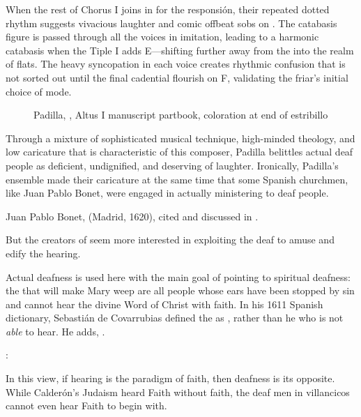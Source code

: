 When the rest of Chorus I joins in for the responsión, their repeated dotted 
rhythm suggests vivacious laughter and comic offbeat sobs on .
The catabasis figure is passed through all the voices in imitation, leading to 
a harmonic catabasis when the Tiple I adds E\fl{}---shifting further away from 
the  into the  realm of flats.
The heavy syncopation in each voice creates rhythmic confusion that is not 
sorted out until the final cadential flourish on F, validating the friar's 
initial choice of mode.

\begin{figure}
    \caption{Padilla, , Altus I manuscript 
    partbook, coloration at end of estribillo}
    \label{figure:Padilla-Sordo1651-AI-coloration}
\end{figure}

Through a mixture of sophisticated musical technique, high-minded theology, and 
low caricature that is characteristic of this composer, Padilla belittles 
actual deaf people as deficient, undignified, and deserving of laughter.
Ironically, Padilla's ensemble made their caricature at the same time that some 
Spanish churchmen, like Juan Pablo Bonet, were engaged in actually ministering 
to deaf people.%
\begin{Footnote}
    Juan Pablo Bonet,  (Madrid, 1620), cited and discussed in 
    \autocite{Plann:DeafEducationSpain}.
\end{Footnote}
But the creators of  seem more interested in 
exploiting the deaf to amuse and edify the hearing.

Actual deafness is used here with the main goal of pointing to spiritual 
deafness: the  that will make Mary weep are all people whose 
ears have been stopped by sin and cannot hear the divine Word of Christ with 
faith.
In his 1611 Spanish dictionary, Sebastián de Covarrubias defined the 
 as , rather than he who is not 
\emph{able} to hear.
He adds, .%
\begin{Footnote}
    \Autocite[]{Covarrubias:Tesoro}:
\end{Footnote}
In this view, if hearing is the paradigm of faith, then deafness is its 
opposite.
While Calderón's Judaism heard Faith without faith, the deaf men in villancicos 
cannot even hear Faith to begin with.

